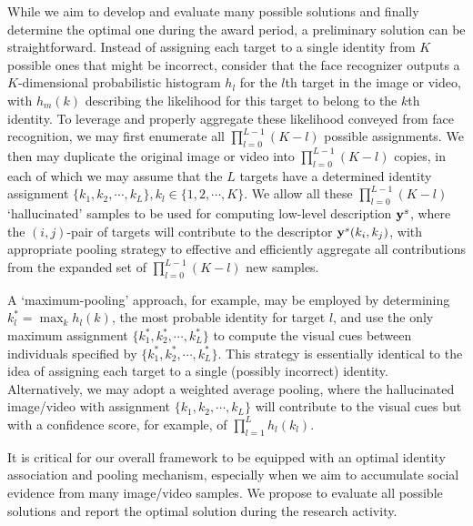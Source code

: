 While we aim to develop and evaluate many possible solutions and finally determine the optimal one during the award period, a preliminary solution can be straightforward. Instead of assigning each target to a single identity from $K$ possible ones that might be incorrect, consider that the face recognizer outputs a $K$-dimensional probabilistic histogram $h_l$ for the $l$th target in the image or video, with $h_m(k)$ describing the likelihood for this target to belong to the $k$th identity. To leverage and properly aggregate these likelihood conveyed from face recognition, we may first enumerate all $\prod_{l=0}^{L-1}(K-l)$ possible assignments. We then may duplicate the original image or video into $\prod_{l=0}^{L-1}(K-l)$ copies, in each of which we may assume that the $L$ targets have a determined identity assignment $\{k_1, k_2, \cdots, k_L\}, k_l\in\{1,2, \cdots, K\}$. We allow all these $\prod_{l=0}^{L-1}(K-l)$ `hallucinated' samples to be used for computing low-level description ${\bf y}^s$, where the $(i,j)$-pair of targets will contribute to the descriptor ${\bf y}^s(k_i,k_j)$, with appropriate pooling strategy to effective and efficiently aggregate all contributions from the expanded set of $\prod_{l=0}^{L-1}(K-l)$ new samples.


A `maximum-pooling' approach, for example, may be employed by determining $k_l^{*}=\max_{k}h_l(k)$, the most probable identity for target $l$, and use the only maximum assignment $\{k_1^{*}, k_2^{*}, \cdots, k_L^{*}\}$ to compute the visual cues between individuals specified by $\{k_1^{*}, k_2^{*}, \cdots, k_L^{*}\}$. This strategy is essentially identical to the idea of assigning each target to a single (possibly incorrect) identity. Alternatively, we may adopt a weighted average pooling, where the hallucinated image/video with assignment $\{k_1, k_2, \cdots, k_L\}$ will contribute to the visual cues but with a confidence score, for example, of $\prod_{l=1}^{L}h_l(k_l)$.

It is critical for our overall framework to be equipped with an optimal identity association and pooling mechanism, especially when we aim to accumulate social evidence from many image/video samples. We propose to evaluate all possible solutions and report the optimal solution during the research activity.